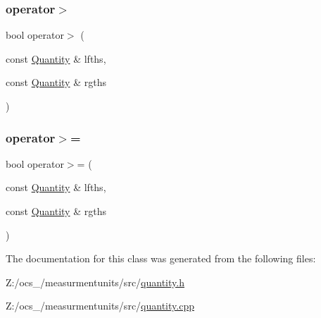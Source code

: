 \mbox{\label{classmunits_1_1_quantity_aa816c6e6e556d7f919273c67c287030b}} 
\subsubsection{\texorpdfstring{operator$>$}{operator>}}
{\footnotesize\ttfamily bool operator$>$ (\begin{DoxyParamCaption}\item[{const \hyperlink{classmunits_1_1_quantity}{Quantity} \&}]{lfths,  }\item[{const \hyperlink{classmunits_1_1_quantity}{Quantity} \&}]{rgths }\end{DoxyParamCaption})\hspace{0.3cm}{\ttfamily [friend]}}

\mbox{\label{classmunits_1_1_quantity_a700091f1868ef19f9bd02f289ac8a1ee}} 
\subsubsection{\texorpdfstring{operator$>$=}{operator>=}}
{\footnotesize\ttfamily bool operator$>$= (\begin{DoxyParamCaption}\item[{const \hyperlink{classmunits_1_1_quantity}{Quantity} \&}]{lfths,  }\item[{const \hyperlink{classmunits_1_1_quantity}{Quantity} \&}]{rgths }\end{DoxyParamCaption})\hspace{0.3cm}{\ttfamily [friend]}}



The documentation for this class was generated from the following files\+:\begin{DoxyCompactItemize}
\item 
Z\+:/ocs\+\_/measurmentunits/src/\hyperlink{quantity_8h}{quantity.\+h}\item 
Z\+:/ocs\+\_/measurmentunits/src/\hyperlink{quantity_8cpp}{quantity.\+cpp}\end{DoxyCompactItemize}
